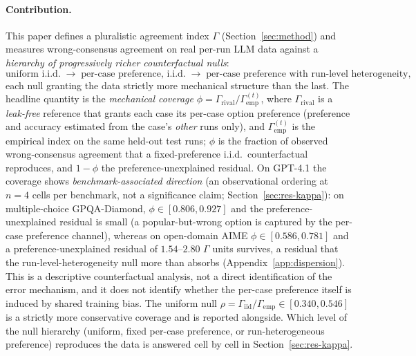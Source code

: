 \documentclass{article}
\newcommand{\agreementIndex}{\Gamma}
\begin{document}
\paragraph{Contribution.} This paper defines a pluralistic agreement index $\agreementIndex$
(Section~\ref{sec:method}) and measures wrong-consensus agreement on real
per-run LLM data against a \emph{hierarchy of progressively richer
counterfactual nulls}:
\[
\text{uniform i.i.d.}
\;\to\;
\text{per-case preference, i.i.d.}
\;\to\;
\text{per-case preference with run-level heterogeneity},
\]
each null granting the data strictly more mechanical structure than the
last. The headline quantity is the \emph{mechanical coverage}
$\phi = \agreementIndex_{\mathrm{rival}} /
\agreementIndex_{\mathrm{emp}}^{(t)}$, where $\agreementIndex_{\mathrm{rival}}$ is a
\emph{leak-free} reference that grants each case its per-case option
preference (preference and accuracy estimated from the case's
\emph{other} runs only), and $\agreementIndex_{\mathrm{emp}}^{(t)}$ is the
empirical index on the same held-out test runs; $\phi$ is the fraction
of observed wrong-consensus agreement that a fixed-preference i.i.d.\
counterfactual reproduces, and $1-\phi$ the
preference-unexplained residual. On GPT-4.1 the coverage shows
\emph{benchmark-associated direction} (an observational ordering at
$n=4$ cells per benchmark, not a significance claim;
Section~\ref{sec:res-kappa}): on
multiple-choice GPQA-Diamond, $\phi\in[0.806,0.927]$ and the
preference-unexplained
residual is small (a popular-but-wrong option is captured by
the per-case preference channel), whereas on open-domain AIME
$\phi\in[0.586,0.781]$
and a preference-unexplained residual of $1.54$--$2.80$ $\agreementIndex$ units
survives, a residual that the run-level-heterogeneity null more than
absorbs (Appendix~\ref{app:dispersion}).
This is a descriptive counterfactual analysis, not a direct
identification of the
error mechanism, and it does not identify whether the per-case
preference itself is induced by shared training bias. The uniform null
$\rho = \agreementIndex_{\mathrm{iid}}/\agreementIndex_{\mathrm{emp}} \in [0.340,0.546]$ is a
strictly more conservative coverage and is reported alongside.
Which level of the null hierarchy (uniform, fixed per-case preference,
or run-heterogeneous preference) reproduces the data
is answered cell by cell in Section~\ref{sec:res-kappa}.
\end{document}

